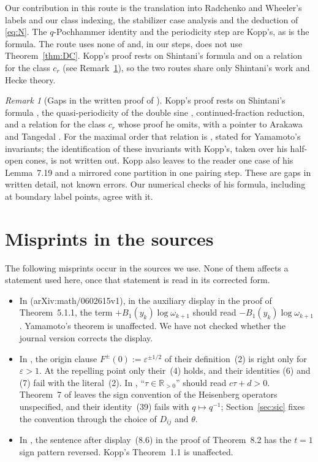 \documentclass[11pt]{amsart}
\numberwithin{equation}{section}
\theoremstyle{plain}
\theoremstyle{definition}
\theoremstyle{remark}
\newtheorem{remark}[theorem]{Remark}
\begin{document}
Our contribution in this route is the translation into Radchenko and Wheeler's labels and our class indexing, the stabilizer case analysis and the deduction of \eqref{eq:N}. The $q$-Pochhammer identity and the periodicity step are Kopp's, as is the formula. The route uses none of \cite{Ya08} and, in our steps, does not use Theorem~\ref{thm:DC}. Kopp's proof rests on Shintani's formula and on a relation for the class $c_r$ (see Remark~\ref{rem:koppgaps}), so the two routes share only Shintani's work and Hecke theory.

\begin{remark}[Gaps in the written proof of {\cite[Thm.~1.1]{Ko}}]\label{rem:koppgaps}
Kopp's proof rests on Shintani's formula \cite[Props.~3, 5]{Sh}, the quasi-periodicity of the double sine \cite{KK}, continued-fraction reduction, and a relation for the class $c_r$ whose proof he omits, with a pointer to Arakawa \cite{Ar} and Tangedal \cite{Tan}. For the maximal order that relation is \cite[Thm.~5.1]{Ya10}, stated for Yamamoto's invariants; the identification of these invariants with Kopp's, taken over his half-open cones, is not written out. Kopp also leaves to the reader one case of his Lemma~7.19 and a mirrored cone partition in one pairing step. These are gaps in written detail, not known errors. Our numerical checks of his formula, including at boundary label points, agree with it.
\end{remark}

\section{Misprints in the sources}\label{app:misprints}

The following misprints occur in the sources we use. None of them affects a statement used here, once that statement is read in its corrected form.

\begin{itemize}
\item In \cite{Ya08} (arXiv:math/0602615v1), in the auxiliary display in the proof of Theorem~5.1.1, the term $+B_1(y_k)\log\omega_{k+1}$ should read $-B_1(y_k)\log\omega_{k+1}$. Yamamoto's theorem is unaffected. We have not checked whether the journal version corrects the display.
\item In \cite{RW}, the origin clause $F^\pm(0):=\varepsilon^{\pm1/2}$ of their definition~(2) is right only for $\varepsilon>1$. At the repelling point only their~(4) holds, and their identities (6) and (7) fail with the literal~(2). In \cite[Thm.~3]{RW}, ``$\tau\in\mathbb R_{>0}$'' should read $c\tau+d>0$. Theorem~7 of \cite{RW} leaves the sign convention of the Heisenberg operators unspecified, and their identity~(39) fails with $q\mapsto q^{-1}$; Section~\ref{sec:sic} fixes the convention through the choice of $D_{ij}$ and $\theta$.
\item In \cite{Ko}, the sentence after display~(8.6) in the proof of Theorem~8.2 has the $t=1$ sign pattern reversed. Kopp's Theorem~1.1 is unaffected.
\end{itemize}
\end{document}
